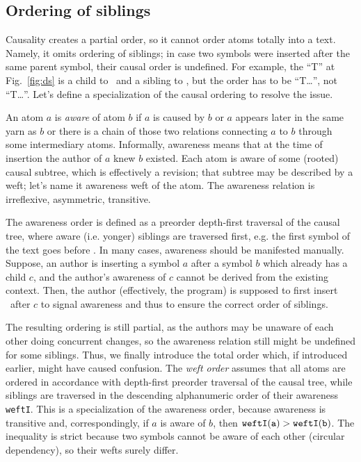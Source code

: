 \documentclass{sig-alternate}
\begin{document}
\subsection {Ordering of siblings}  \label{sec:siblord}

Causality creates a partial order, so it cannot order atoms totally into a text.
Namely, it omits ordering of siblings; in case two symbols were inserted after the same parent symbol, their causal order is undefined.
For example, the ``T'' at Fig.~\ref{fig:ds} is a child to \aum ~and a sibling to \eoa, but the order has to be ``\aum T\ldots\eoa'', not ``\aum \eoa T\ldots''.
Let's define a specialization of the causal ordering to resolve the issue.

An atom $a$ is \emph{aware} of atom $b$ if $a$ is caused by $b$ or $a$ appears later in the same yarn as $b$ or there is a chain of those two relations connecting $a$ to $b$ through some intermediary atoms.
Informally, awareness means that at the time of insertion the author of $a$ knew $b$ existed. 
Each atom is aware of some (rooted) causal subtree, which is effectively a revision; that subtree may be described by a weft; let's name it awareness weft of the atom.
The awareness relation is irreflexive, asymmetric, transitive.

The awareness order is  defined as a preorder depth-first traversal of the causal tree, where aware (i.e. yonger) siblings are traversed first, e.g. the first symbol of the text goes before \eoa.
In many cases, awareness should be manifested manually.
Suppose, an author is inserting a symbol $a$ after a symbol $b$ which already has a child $c$, and the author's awareness of $c$ cannot be derived from the existing context.
Then, the author (effectively, the program) is supposed to first insert \zero ~after $c$ to signal awareness and thus to ensure the correct order of siblings.

The resulting ordering is still partial, as the authors may be unaware of each other doing concurrent changes, so the awareness relation still might be undefined for some siblings.
Thus, we finally introduce the total order which, if introduced earlier, might have caused confusion.
The \emph{weft order} assumes that all atoms are ordered in accordance with depth-first preorder traversal of the causal tree, while siblings are traversed in the descending  alphanumeric order of their awareness {\tt weftI}.
This is a specialization of the awareness order, because awareness is transitive and, correspondingly, if $a$ is aware of $b$, then $\tt weftI(a) > weftI(b)$.
The inequality is strict because two symbols cannot be aware of each other (circular dependency), so their wefts surely differ.
\end{document}
